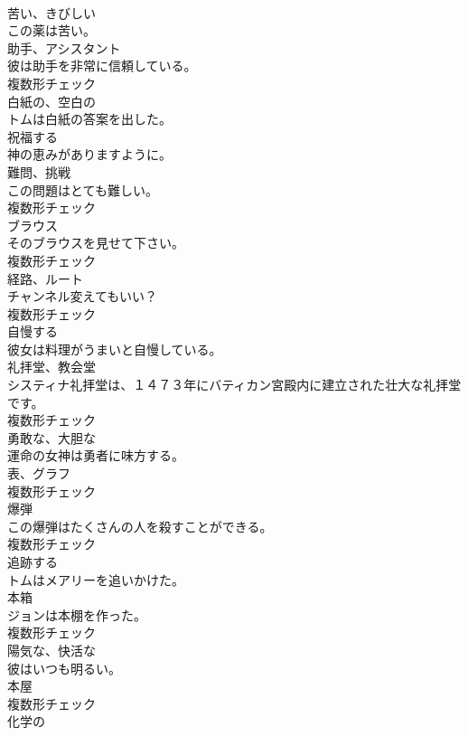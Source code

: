 \documentclass[8pt]{extreport}
\begin{document}
\begin{CJK}{UTF8}{min}
\\	[形容詞]	苦い、きびしい	
\\	この薬は苦い。	
\\	[名詞]	助手、アシスタント	
\\	彼は助手を非常に信頼している。	
\\	複数形チェック
\\	[形容詞]	白紙の、空白の	
\\	トムは白紙の答案を出した。	
\\	[動詞]	祝福する	
\\	神の恵みがありますように。	
\\	[名詞]	難問、挑戦	
\\	この問題はとても難しい。	
\\	複数形チェック
\\	[名詞]	ブラウス	
\\	そのブラウスを見せて下さい。	
\\	複数形チェック
\\	[名詞]	経路、ルート	
\\	チャンネル変えてもいい？	
\\	複数形チェック
\\	[動詞]	自慢する	
\\	彼女は料理がうまいと自慢している。	
\\	[名詞]	礼拝堂、教会堂	
\\	システィナ礼拝堂は、１４７３年にバティカン宮殿内に建立された壮大な礼拝堂です。	
\\	複数形チェック
\\	[形容詞]	勇敢な、大胆な	
\\	運命の女神は勇者に味方する。	
\\	[名詞]	表、グラフ	
\\	複数形チェック
\\	[名詞]	爆弾	
\\	この爆弾はたくさんの人を殺すことができる。	
\\	複数形チェック
\\	[動詞]	追跡する	
\\	トムはメアリーを追いかけた。	
\\	[名詞]	本箱	
\\	ジョンは本棚を作った。	
\\	複数形チェック
\\	[形容詞]	陽気な、快活な	
\\	彼はいつも明るい。	
\\	[名詞]	本屋	
\\	複数形チェック
\\	[形容詞]	化学の	

\end{CJK}
\end{document}
